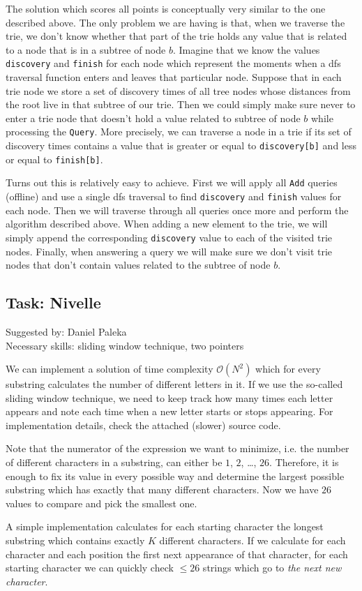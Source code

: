 \documentclass[a4paper]{article}
\begin{document}
The solution which scores all points is conceptually very similar to the
one described above. The only problem we are having is that, when we traverse
the trie, we don't know whether that part of the trie holds any value that
is related to a node that is in a subtree of node $b$. Imagine that we know
the values \texttt{discovery} and \texttt{finish} for each node which represent
the moments when a dfs traversal function enters and leaves that particular node.
Suppose that in each trie node we store a set of discovery times of all tree
nodes whose distances from the root live in that subtree of our trie. Then we
could simply make sure never to enter a trie node that doesn't hold a value
related to subtree of node $b$ while processing the \texttt{Query}. More
precisely, we can traverse a node in a trie if its set of discovery times
contains a value that is greater or equal to \texttt{discovery[b]} and
less or equal to \texttt{finish[b]}.

Turns out this is relatively easy to achieve. First we will apply all
\texttt{Add} queries (offline) and use a single dfs traversal to find
\texttt{discovery} and \texttt{finish} values for each node. Then we will
traverse through all queries once more and perform the algorithm described
above. When adding a new element to the trie, we will simply append the
corresponding \texttt{discovery} value to each of the visited trie nodes.
Finally, when answering a query we will make sure we don't visit trie
nodes that don't contain values related to the subtree of node $b$.

\subsection*{Task: Nivelle}
\textsf{Suggested by: Daniel Paleka}\\
\textsf{Necessary skills: sliding window technique, two pointers}

We can implement a solution of time complexity $\mathcal{O}(N^2)$ which
for every substring calculates the number of different letters in it. If
we use the so-called sliding window technique, we need to keep track
how many times each letter appears and note each time when a new letter
starts or stops appearing. For implementation details, check the attached
(slower) source code.

Note that the numerator of the expression we want to minimize, i.e. the
number of different characters in a substring, can either be $1$, $2$, \dots,
$26$. Therefore, it is enough to fix its value in every possible way and
determine the largest possible substring which has exactly that many different
characters. Now we have $26$ values to compare and pick the smallest one.

A simple implementation calculates for each starting character the longest
substring which contains exactly $K$ different characters. If we calculate
for each character and each position the first next appearance of that
character, for each starting character we can quickly check $\le 26$ strings
which go to \textit{the next new character}.
\end{document}
